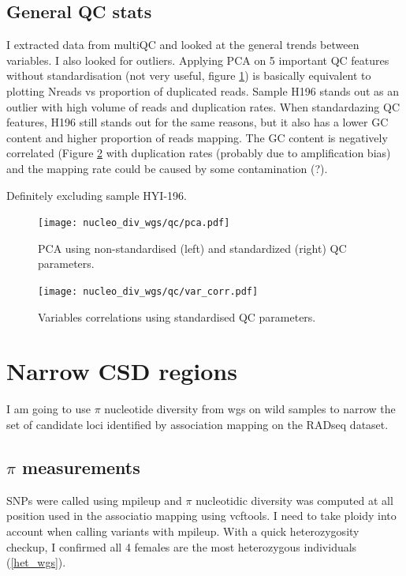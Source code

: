 \documentclass[10pt,a4paper]{report}
\begin{document}
\subsection{General QC stats}
I extracted data from multiQC and looked at the general trends between variables. I also looked for outliers.  Applying PCA  on 5 important QC features without standardisation (not very useful, figure \ref{PCA_QC}) is basically equivalent to plotting Nreads vs proportion of duplicated reads. Sample H196 stands out as an outlier with high volume of reads and duplication rates. When standardazing QC features, H196 still stands out for the same reasons, but it also has a lower GC content and higher proportion of reads mapping. The GC content is negatively correlated (Figure \ref{heat_var_QC} with duplication rates (probably due to amplification bias) and the mapping rate could be caused by some contamination (?).

Definitely excluding sample HYI-196.

\begin{figure}
\texttt{[image: nucleo\_div\_wgs/qc/pca.pdf]}
\caption{PCA using non-standardised (left) and standardized (right) QC parameters.}
\label{PCA_QC}
\end{figure}

\begin{figure}
\texttt{[image: nucleo\_div\_wgs/qc/var\_corr.pdf]}
\caption{Variables correlations using standardised QC parameters.}
\label{heat_var_QC}
\end{figure}

\section{Narrow CSD regions}
I am going to use $\pi$ nucleotide diversity from wgs on wild samples to narrow the set of candidate loci identified by association mapping on the RADseq dataset.

\subsection{$\pi$ measurements}
SNPs were called using mpileup and $\pi$ nucleotidic diversity was computed at all position used in the associatio mapping using vcftools. I need to take ploidy into account when calling variants with mpileup. With a quick heterozygosity checkup, I confirmed all 4 females are the most heterozygous individuals (\ref{het_wgs}).
\end{document}
